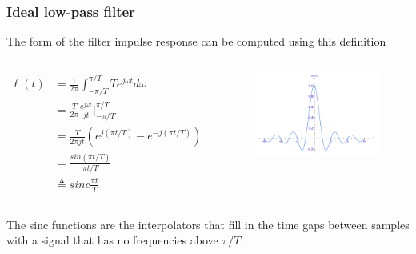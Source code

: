 \begin{frame}
	\frametitle{Ideal low-pass filter}
	The form of the filter impulse response can be computed using this definition\\
	\vspace{-2ex}
	\begin{columns}
		\begin{equation}
		\begin{split}
		\ell(t) & = \frac{1}{2\pi} \int_{-\pi/T}^{\pi/T}Te^{j\omega t}d\omega\\
		& = \frac{T}{2\pi} \frac{e^{j\omega t}}{jt} \Big|_{-\pi/T}^{\pi/T}\\
		& = \frac{T}{2\pi jt}(e^{j(\pi t/T)}-e^{-j(\pi t/T)})\\
		& = \frac{sin(\pi t/T)}{\pi t/T}\\
		& \triangleq sinc\frac{\pi t}{T} \nonumber
		\end{split}
		\end{equation}
		\vspace{-2ex}
		\begin{figure}
			\includegraphics[width=1.1\linewidth]{sinc}
		\end{figure}
	\end{columns}
	The sinc functions are the interpolators that fill in the time gaps between samples with a signal that has no frequencies above $\pi/T$.
\end{frame}

